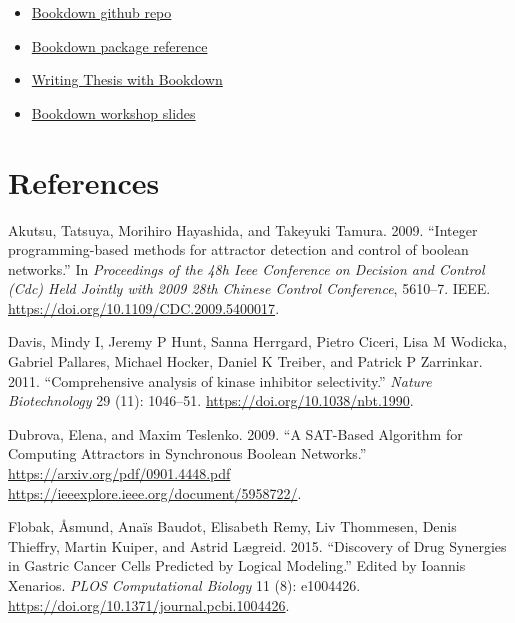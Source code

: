 \documentclass[
  12pt,
]{book}
\providecommand{\tightlist}{%
  \setlength{\itemsep}{0pt}\setlength{\parskip}{0pt}}
\begin{document}
\begin{itemize}
\tightlist
\item
  \href{https://github.com/rstudio/bookdown/}{Bookdown github repo}
\item
  \href{https://bookdown.org/yihui/bookdown/}{Bookdown package reference}
\item
  \href{https://eddjberry.netlify.com/post/writing-your-thesis-with-bookdown/}{Writing Thesis with Bookdown}
\item
  \href{https://arm.rbind.io/slides/bookdown.html}{Bookdown workshop slides}
\end{itemize}

\hypertarget{references}{%
\chapter*{References}\label{references}}

\hypertarget{refs}{}
\leavevmode\hypertarget{ref-Akutsu2009}{}%
Akutsu, Tatsuya, Morihiro Hayashida, and Takeyuki Tamura. 2009. ``Integer programming-based methods for attractor detection and control of boolean networks.'' In \emph{Proceedings of the 48h Ieee Conference on Decision and Control (Cdc) Held Jointly with 2009 28th Chinese Control Conference}, 5610--7. IEEE. \url{https://doi.org/10.1109/CDC.2009.5400017}.

\leavevmode\hypertarget{ref-Davis2011}{}%
Davis, Mindy I, Jeremy P Hunt, Sanna Herrgard, Pietro Ciceri, Lisa M Wodicka, Gabriel Pallares, Michael Hocker, Daniel K Treiber, and Patrick P Zarrinkar. 2011. ``Comprehensive analysis of kinase inhibitor selectivity.'' \emph{Nature Biotechnology} 29 (11): 1046--51. \url{https://doi.org/10.1038/nbt.1990}.

\leavevmode\hypertarget{ref-Dubrova2009}{}%
Dubrova, Elena, and Maxim Teslenko. 2009. ``A SAT-Based Algorithm for Computing Attractors in Synchronous Boolean Networks.'' \href{https://arxiv.org/pdf/0901.4448.pdf\%20https://ieeexplore.ieee.org/document/5958722/}{https://arxiv.org/pdf/0901.4448.pdf https://ieeexplore.ieee.org/document/5958722/}.

\leavevmode\hypertarget{ref-Flobak2015}{}%
Flobak, Åsmund, Anaïs Baudot, Elisabeth Remy, Liv Thommesen, Denis Thieffry, Martin Kuiper, and Astrid Lægreid. 2015. ``Discovery of Drug Synergies in Gastric Cancer Cells Predicted by Logical Modeling.'' Edited by Ioannis Xenarios. \emph{PLOS Computational Biology} 11 (8): e1004426. \url{https://doi.org/10.1371/journal.pcbi.1004426}.
\end{document}
